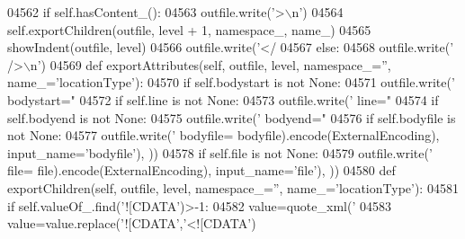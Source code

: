 \begin{DoxyCode}
{{{{{{{{{{{{{{{{{{{{{{{{{{{{{{{{{{{{{{{{{{{{{{{{{{{{{{{{{{{{{{{{{{{{{{{{{{{{{{{{{{{{{{{{{{{{{{{{{{{{{{{{{{{{{{{{{{{{{{{{{{{{{{{{{{{{{{{{{{{{{{{{{{{{{{{{{{{{{{{{{{{{{{{{{{{{{{{{{{{{{{{{{{{{{{{{{{{{{{{{{{{{{{{{{{{{{{{{{{{{{{{{{{{{{{{{{{{{{{{{{{{{{{{{{{{{{{{{{{{{{{{{{{{{{{{{{{{{{{{{{{{{{{{{{{{{{{{{{{{{{{{04562         \textcolor{keywordflow}{if} self.hasContent_():
04563             outfile.write(\textcolor{stringliteral}{'>\(\backslash\)n'})
04564             self.exportChildren(outfile, level + 1, namespace\_, name\_)
04565             showIndent(outfile, level)
04566             outfile.write(\textcolor{stringliteral}{'</%
04567         \textcolor{keywordflow}{else}:
04568             outfile.write(\textcolor{stringliteral}{' />\(\backslash\)n'})
04569     \textcolor{keyword}{def }exportAttributes(self, outfile, level, namespace\_='', name\_='locationType'):
04570         \textcolor{keywordflow}{if} self.bodystart \textcolor{keywordflow}{is} \textcolor{keywordflow}{not} \textcolor{keywordtype}{None}:
04571             outfile.write(\textcolor{stringliteral}{' bodystart="%
04572         \textcolor{keywordflow}{if} self.line \textcolor{keywordflow}{is} \textcolor{keywordflow}{not} \textcolor{keywordtype}{None}:
04573             outfile.write(\textcolor{stringliteral}{' line="%
04574         \textcolor{keywordflow}{if} self.bodyend \textcolor{keywordflow}{is} \textcolor{keywordflow}{not} \textcolor{keywordtype}{None}:
04575             outfile.write(\textcolor{stringliteral}{' bodyend="%
04576         \textcolor{keywordflow}{if} self.bodyfile \textcolor{keywordflow}{is} \textcolor{keywordflow}{not} \textcolor{keywordtype}{None}:
04577             outfile.write(\textcolor{stringliteral}{' bodyfile=%
      bodyfile).encode(ExternalEncoding), input\_name=\textcolor{stringliteral}{'bodyfile'}), ))
04578         \textcolor{keywordflow}{if} self.file \textcolor{keywordflow}{is} \textcolor{keywordflow}{not} \textcolor{keywordtype}{None}:
04579             outfile.write(\textcolor{stringliteral}{' file=%
      file).encode(ExternalEncoding), input\_name=\textcolor{stringliteral}{'file'}), ))
04580     \textcolor{keyword}{def }exportChildren(self, outfile, level, namespace\_='', name\_='locationType'):
04581         \textcolor{keywordflow}{if} self.valueOf\_.find(\textcolor{stringliteral}{'![CDATA'})>-1:
04582             value=quote_xml(\textcolor{stringliteral}{'%
04583             value=value.replace(\textcolor{stringliteral}{'![CDATA'},\textcolor{stringliteral}{'<![CDATA'})
}}}}}}}}}}}}}}}}}}}}}}}}}}}}}}}}}}}}}}}}}}}}}}}}}}}}}}}}}}}}}}}}}}}}}}}}}}}}}}}}}}}}}}}}}}}}}}}}}}}}}}}}}}}}}}}}}}}}}}}}}}}}}}}}}}}}}}}}}}}}}}}}}}}}}}}}}}}}}}}}}}}}}}}}}}}}}}}}}}}}}}}}}}}}}}}}}}}}}}}}}}}}}}}}}}}}}}}}}}}}}}}}}}}}}}}}}}}}}}}}}}}}}}}}}}}}}}}}}}}}}}}}}}}}}}}}}}}}}}}}}}}}}}}}}}}}}}}}}}}}}}}}}}}}}}
\end{DoxyCode}

